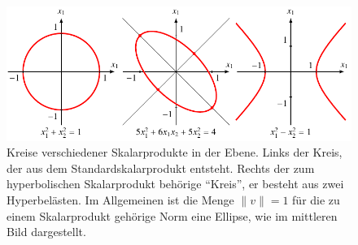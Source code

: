 %
%
%
\begin{figure}
\centering
\includegraphics{chapters/010-skalarprodukt/images/kreise.pdf}
\caption{Kreise verschiedener Skalarprodukte in der Ebene.
Links der Kreis, der aus dem Standardskalarprodukt entsteht.
Rechts der zum hyperbolischen Skalarprodukt behörige ``Kreis'', er
besteht aus zwei Hyperbelästen.
Im Allgemeinen ist die Menge $\|v\|=1$ für die zu einem Skalarprodukt
gehörige Norm eine Ellipse, wie im mittleren Bild dargestellt.
\label{buch:skalarprodukt:definition:fig:kreise}}
\end{figure}
